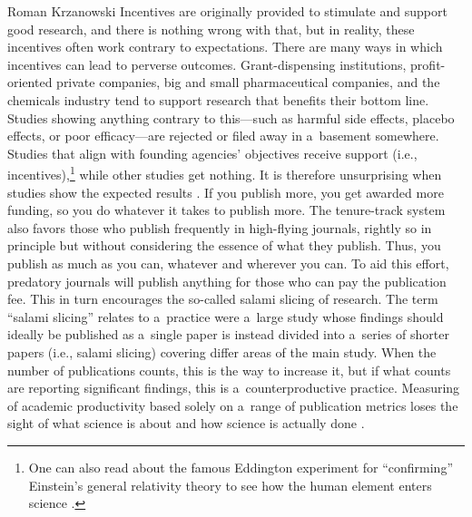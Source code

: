 \begin{newrevengenv}{Roman Krzanowski}
Incentives are originally provided to stimulate and support good research, and there is nothing wrong with that, but in reality, these incentives often work contrary to expectations. There are many ways in which incentives can lead to perverse outcomes. Grant-dispensing institutions, profit-oriented private companies, big and small pharmaceutical companies, and the chemicals industry tend to support research that benefits their bottom line. Studies showing anything contrary to this—such as harmful side effects, placebo effects, or poor efficacy—are rejected or filed away in a~basement somewhere. Studies that align with founding agencies' objectives receive support (i.e., incentives),\footnote{One can also read about the famous Eddington experiment for ``confirming'' Einstein's general relativity theory to see how the human element enters science
\parencite[][]{strevens_knowledge_2022}. %
 } while other studies get nothing. It is therefore unsurprising when studies show the expected results 
\parencite[see also][]{strevens_knowledge_2022}. %
 If you publish more, you get awarded more funding, so you do whatever it takes to publish more. The tenure-track system also favors those who publish frequently in high-flying journals, rightly so in principle but without considering the essence of what they publish. Thus, you publish as much as you can, whatever and wherever you can. To aid this effort, predatory journals will publish anything for those who can pay the publication fee. This in turn encourages the so-called salami slicing of research. The term ``salami slicing'' relates to a~practice were a~large study whose findings should ideally be published as a~single paper is instead divided into a~series of shorter papers (i.e., salami slicing) covering differ areas of the main study. When the number of publications counts, this is the way to increase it, but if what counts are reporting significant findings, this is a~counterproductive practice. Measuring of academic productivity based solely on a~range of publication metrics 
\parencite[see e.g.][]{carpenter_using_2014} %
 loses the sight of what science is about and how science is actually done 
\parencite[][]{polak_naukometryczne_2011}.%



\end{newrevengenv}

